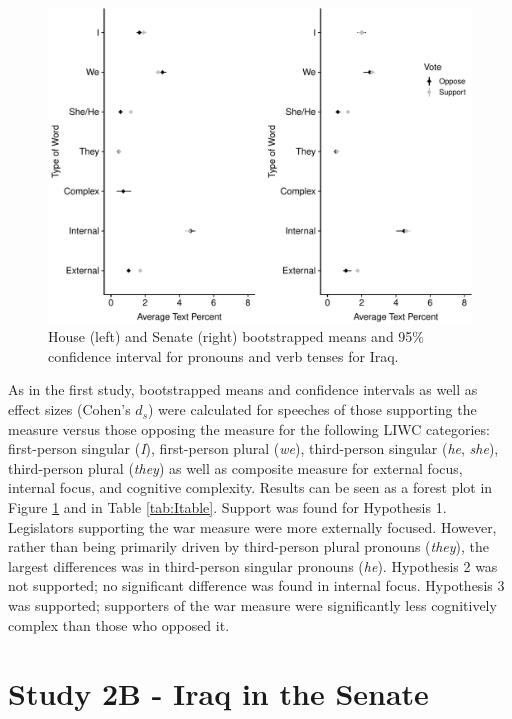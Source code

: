 \documentclass[english,,man,floatsintext]{apa6}
\begin{document}
\begin{figure}
\centering
\includegraphics{Language_of_War_Markdown_KJ2_files/figure-latex/Ipic-1.pdf}
\caption{\label{fig:Ipic}House (left) and Senate (right) bootstrapped means and 95\% confidence interval for pronouns and verb tenses for Iraq.}
\end{figure}

As in the first study, bootstrapped means and confidence intervals as well as effect sizes (Cohen's \(d_s\)) were calculated for speeches of those supporting the measure versus those opposing the measure for the following LIWC categories: first-person singular (\emph{I}), first-person plural (\emph{we}), third-person singular (\emph{he}, \emph{she}), third-person plural (\emph{they}) as well as composite measure for external focus, internal focus, and cognitive complexity. Results can be seen as a forest plot in Figure \ref{fig:Ipic} and in Table \ref{tab:Itable}. Support was found for Hypothesis 1. Legislators supporting the war measure were more externally focused. However, rather than being primarily driven by third-person plural pronouns (\emph{they}), the largest differences was in third-person singular pronouns (\emph{he}). Hypothesis 2 was not supported; no significant difference was found in internal focus. Hypothesis 3 was supported; supporters of the war measure were significantly less cognitively complex than those who opposed it.

\hypertarget{study-2b---iraq-in-the-senate}{%
\section{Study 2B - Iraq in the Senate}\label{study-2b---iraq-in-the-senate}}
\end{document}
